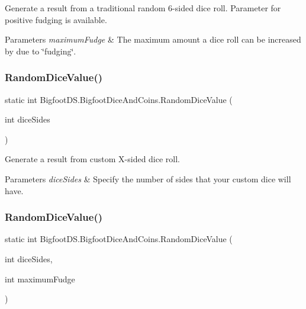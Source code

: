 Generate a result from a traditional random 6-\/sided dice roll. Parameter for positive fudging is available. 


\begin{DoxyParams}{Parameters}
{\em maximum\+Fudge} & The maximum amount a dice roll can be increased by due to \char`\"{}fudging\char`\"{}.\\
\hline
\end{DoxyParams}
\mbox{\label{class_bigfoot_d_s_1_1_bigfoot_dice_and_coins_a6d6665f7273e50d5971dcd4aaa1c371e}} 
\subsubsection{\texorpdfstring{Random\+Dice\+Value()}{RandomDiceValue()}\hspace{0.1cm}{\footnotesize\ttfamily [1/2]}}
{\footnotesize\ttfamily static int Bigfoot\+D\+S.\+Bigfoot\+Dice\+And\+Coins.\+Random\+Dice\+Value (\begin{DoxyParamCaption}\item[{int}]{dice\+Sides }\end{DoxyParamCaption})\hspace{0.3cm}{\ttfamily [static]}}



Generate a result from custom X-\/sided dice roll. 


\begin{DoxyParams}{Parameters}
{\em dice\+Sides} & Specify the number of sides that your custom dice will have.\\
\hline
\end{DoxyParams}
\mbox{\label{class_bigfoot_d_s_1_1_bigfoot_dice_and_coins_acd7f9d81c931fdfcf2c493d900e0ee45}} 
\subsubsection{\texorpdfstring{Random\+Dice\+Value()}{RandomDiceValue()}\hspace{0.1cm}{\footnotesize\ttfamily [2/2]}}
{\footnotesize\ttfamily static int Bigfoot\+D\+S.\+Bigfoot\+Dice\+And\+Coins.\+Random\+Dice\+Value (\begin{DoxyParamCaption}\item[{int}]{dice\+Sides,  }\item[{int}]{maximum\+Fudge }\end{DoxyParamCaption})\hspace{0.3cm}{\ttfamily [static]}}



